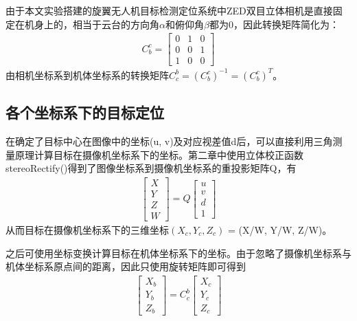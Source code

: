 由于本文实验搭建的旋翼无人机目标检测定位系统中ZED双目立体相机是直接固定在机身上的，相当于云台的方向角$\alpha$和俯仰角$\beta$都为0，因此转换矩阵简化为：
%
\begin{eqnarray}
C_b^c =
\begin{bmatrix}
0 & 1 & 0 \\
0 & 0 & 1 \\
1 & 0 & 0
\end{bmatrix}
\end{eqnarray}
由相机坐标系到机体坐标系的转换矩阵$C_c^b = (C_b^c)^{-1} = (C_b^c)^T$。

\subsection{各个坐标系下的目标定位}
在确定了目标中心在图像中的坐标(u, v)及对应视差值d后，可以直接利用三角测量原理计算目标在摄像机坐标系下的坐标。第二章中使用立体校正函数stereoRectify()得到了图像坐标系到摄像机坐标系的重投影矩阵Q，有
%
\begin{eqnarray}
\begin{bmatrix}
X \\ Y \\ Z \\ W
\end{bmatrix}
= Q
\begin{bmatrix}
u \\ v \\ d \\ 1
\end{bmatrix}
\end{eqnarray}
从而目标在摄像机坐标系下的三维坐标$(X_c, Y_c, Z_c)$ = (X/W, Y/W, Z/W)。

之后可使用坐标变换计算目标在机体坐标系下的坐标。由于忽略了摄像机坐标系与机体坐标系原点间的距离，因此只使用旋转矩阵即可得到
%
\begin{eqnarray}
\begin{bmatrix}
X_b \\ Y_b \\ Z_b
\end{bmatrix}
= C_c^b
\begin{bmatrix}
X_c \\ Y_c \\ Z_c
\end{bmatrix}
\end{eqnarray}

